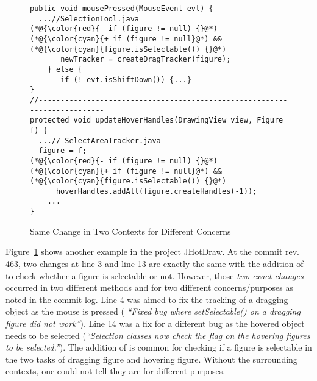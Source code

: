 \begin{figure}[t]
	\centering
	\begin{lstlisting}[]
public void mousePressed(MouseEvent evt) { 
  ...//SelectionTool.java
(*@{\color{red}{- if (figure != null) {}@*)
(*@{\color{cyan}{+ if (figure != null}@*) && (*@{\color{cyan}{figure.isSelectable()) {}@*)
       newTracker = createDragTracker(figure);
    } else {
       if (! evt.isShiftDown()) {...}
}
//--------------------------------------------------------------------------
protected void updateHoverHandles(DrawingView view, Figure f) {
  ...// SelectAreaTracker.java
  figure = f;
(*@{\color{red}{- if (figure != null) {}@*)
(*@{\color{cyan}{+ if (figure != null}@*) && (*@{\color{cyan}{figure.isSelectable()) {}@*)
      hoverHandles.addAll(figure.createHandles(-1));
    ...
}
	\end{lstlisting}
        \vspace{-15pt}
        \caption{Same Change in Two Contexts for Different Concerns}
        \vspace{-6pt}
        \label{fig:motiv-context}
\end{figure}

Figure~\ref{fig:motiv-context} shows another example in the project
JHotDraw. At the commit rev. 463, two changes at line 3 and line 13
are exactly the same with the addition of 
to check whether a figure is selectable or not. However, those {\em
  two exact changes} occurred in two different methods
 and  for two different
concerns/purposes as noted in the commit log. Line 4 was aimed to fix
the tracking of a dragging object as the mouse is pressed ({\em
  ``Fixed bug where setSelectable() on a dragging figure did not
  work''}).  Line 14 was a fix for a different bug as the hovered
object needs to be selected ({\em ``Selection classes now check the
  flag on the hovering figures to be selected.''}). The addition of
 is common for checking if a figure is
selectable in the two tasks of dragging figure and hovering
figure. Without the surrounding contexts, one could not tell they are
for different purposes.

